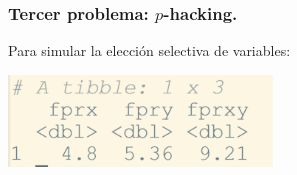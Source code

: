 \documentclass[9pt]{beamer}
\begin{document}
\begin{frame}
  \frametitle{Tercer problema: $p$-hacking.}
  \begin{overlayarea}{\textwidth}{\textheight}
  Para simular la elección selectiva de variables:\\
  \begin{center}
  \includegraphics[width=7cm]{images/resultados_seleccion_variable}    
  \end{center}

\end{overlayarea}
\end{frame}
\end{document}
